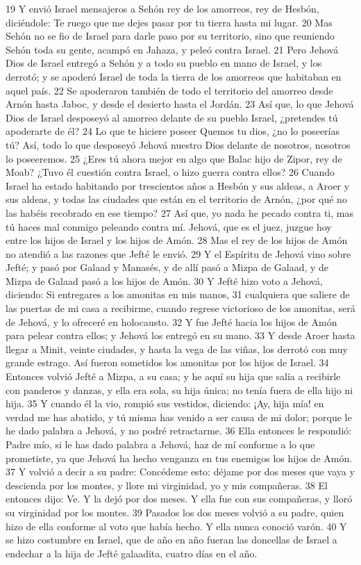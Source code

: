 19 Y envió Israel mensajeros a Sehón rey de los amorreos, rey de Hesbón, diciéndole: Te ruego que me dejes pasar por tu tierra hasta mi lugar.
20 Mas Sehón no se fio de Israel para darle paso por su territorio, sino que reuniendo Sehón toda su gente, acampó en Jahaza, y peleó contra Israel.
21 Pero Jehová Dios de Israel entregó a Sehón y a todo su pueblo en mano de Israel, y los derrotó; y se apoderó Israel de toda la tierra de los amorreos que habitaban en aquel país.
22 Se apoderaron también de todo el territorio del amorreo desde Arnón hasta Jaboc, y desde el desierto hasta el Jordán. 
23 Así que, lo que Jehová Dios de Israel desposeyó al amorreo delante de su pueblo Israel, ¿pretendes tú apoderarte de él?
24 Lo que te hiciere poseer Quemos tu dios, ¿no lo poseerías tú? Así, todo lo que desposeyó Jehová nuestro Dios delante de nosotros, nosotros lo poseeremos.
25 ¿Eres tú ahora mejor en algo que Balac hijo de Zipor, rey de Moab? ¿Tuvo él cuestión contra Israel, o hizo guerra contra ellos?
26 Cuando Israel ha estado habitando por trescientos años a Hesbón y sus aldeas, a Aroer y sus aldeas, y todas las ciudades que están en el territorio de Arnón, ¿por qué no las habéis recobrado en ese tiempo? 
27 Así que, yo nada he pecado contra ti, mas tú haces mal conmigo peleando contra mí. Jehová, que es el juez, juzgue hoy entre los hijos de Israel y los hijos de Amón.
28 Mas el rey de los hijos de Amón no atendió a las razones que Jefté le envió.
29 Y el Espíritu de Jehová vino sobre Jefté; y pasó por Galaad y Manasés, y de allí pasó a Mizpa de Galaad, y de Mizpa de Galaad pasó a los hijos de Amón.
30 Y Jefté hizo voto a Jehová, diciendo: Si entregares a los amonitas en mis manos,
31 cualquiera que saliere de las puertas de mi casa a recibirme, cuando regrese victorioso de los amonitas, será de Jehová, y lo ofreceré en holocausto.
32 Y fue Jefté hacia los hijos de Amón para pelear contra ellos; y Jehová los entregó en su mano.
33 Y desde Aroer hasta llegar a Minit, veinte ciudades, y hasta la vega de las viñas, los derrotó con muy grande estrago. Así fueron sometidos los amonitas por los hijos de Israel.
34 Entonces volvió Jefté a Mizpa, a su casa; y he aquí su hija que salía a recibirle con panderos y danzas, y ella era sola, su hija única; no tenía fuera de ella hijo ni hija.
35 Y cuando él la vio, rompió sus vestidos, diciendo: ¡Ay, hija mía! en verdad me has abatido, y tú misma has venido a ser causa de mi dolor; porque le he dado palabra a Jehová, y no podré retractarme. 
36 Ella entonces le respondió: Padre mío, si le has dado palabra a Jehová, haz de mí conforme a lo que prometiste, ya que Jehová ha hecho venganza en tus enemigos los hijos de Amón.
37 Y volvió a decir a su padre: Concédeme esto: déjame por dos meses que vaya y descienda por los montes, y llore mi virginidad, yo y mis compañeras.
38 El entonces dijo: Ve. Y la dejó por dos meses. Y ella fue con sus compañeras, y lloró su virginidad por los montes.
39 Pasados los dos meses volvió a su padre, quien hizo de ella conforme al voto que había hecho. Y ella nunca conoció varón.
40 Y se hizo costumbre en Israel, que de año en año fueran las doncellas de Israel a endechar a la hija de Jefté galaadita, cuatro días en el año.

